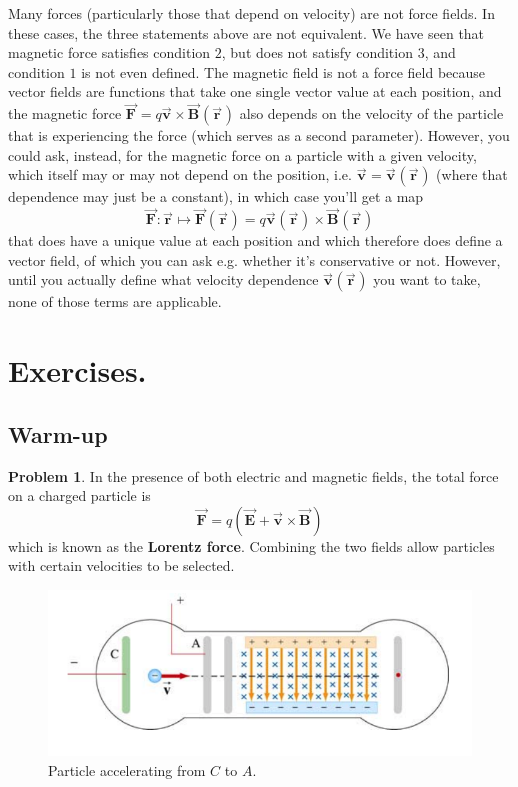 \documentclass[11pt, letterpaper]{article}
\theoremstyle{definition}
\theoremstyle{remark}
\newcommand{\bv}[2][]{\bm{\vec{#2}_{#1}}}
\begin{document}
Many forces (particularly those that depend on velocity) are not force fields. In these cases, the three statements above are not equivalent. We have seen that magnetic force satisfies condition $2$, but does not satisfy condition $3$, and condition $1$ is not even defined. The magnetic field is not a force field because vector fields are functions that take one single vector value at each position, and the magnetic force $\bv{F} = q\bv{v}\times\bv{B}(\bv{r})$ also depends on the velocity of the particle that is experiencing the force (which serves as a second parameter). However, you could ask, instead, for the magnetic force on a particle with a given velocity, which itself may or may not depend on the position, i.e. $\bv{v} = \bv{v}(\bv{r})$ (where that dependence may just be a constant), in which case you'll get a map \[\bv{F}\colon\bv{r}\mapsto\bv{F}(\bv{r}) = q\bv{v}(\bv{r})\times\bv{B}(\bv{r})\] that does have a unique value at each position and which therefore does define a vector field, of which you can ask e.g. whether it's conservative or not. However, until you actually define what velocity dependence $\bv{v}(\bv{r})$ you want to take, none of those terms are applicable.

\section{Exercises.}
\subsection{Warm-up} %
\textbf{Problem 1}. In the presence of both electric and magnetic fields, the total force on a charged particle is \[\bv{F} = q(\bv{E} + \bv{v}\times\bv{B})\] which is known as the \textbf{Lorentz force}. Combining the two fields allow particles with certain velocities to be selected. 
\begin{figure}[h!]
	\centering
	\includegraphics[scale=0.7]{apparatus}
	\caption{Particle accelerating from $C$ to $A$.}
	\label{fig:apparatus}
\end{figure}
\end{document}
